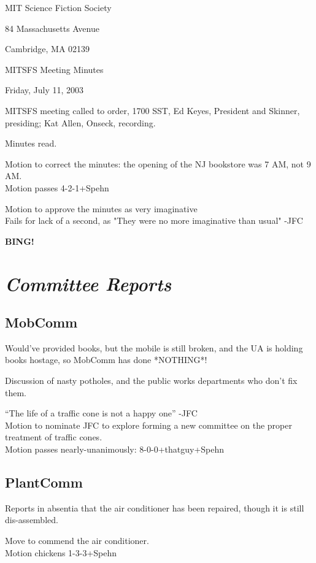 \documentclass[10pt]{article}
\newcommand{\bing}{{\bf BING!} }
\newcommand{\goto}[1]{\bing \vskip 12pt \section*{{\em{#1}}}}
\begin{document}
\begin{center}

MIT Science Fiction Society 

84 Massachusetts Avenue

Cambridge, MA 02139

\vspace{12pt}

MITSFS Meeting Minutes 

Friday, July 11, 2003

\end{center}
 
\vspace{18pt}

\setlength{\parskip}{6pt}

\noindent
MITSFS meeting called to order, 1700 SST, Ed Keyes, President and
Skinner, presiding; Kat Allen,  Onseck, recording.

Minutes read.

Motion to correct the minutes: the opening of the NJ bookstore was
7 AM, not 9 AM.  \\
Motion passes 4-2-1+Spehn

Motion to approve the minutes as very imaginative\\
Fails for lack of a second, as "They were no more imaginative than usual" -JFC

\goto{Committee Reports}
\subsection*{MobComm}
Would've provided books, but the mobile is still broken, and the UA is
holding books hostage, so MobComm has done *NOTHING*!

Discussion of nasty potholes, and the public works departments who
don't fix them.

``The life of a traffic cone is not a happy one'' -JFC\\
Motion to nominate JFC to explore forming a new committee on the
proper treatment of traffic cones.\\
Motion passes nearly-unanimously: 8-0-0+thatguy+Spehn

\subsection*{PlantComm}
Reports in absentia that the air conditioner has been repaired, though
it is still dis-assembled.

Move to commend the air conditioner.\\
Motion chickens 1-3-3+Spehn
\end{document}
